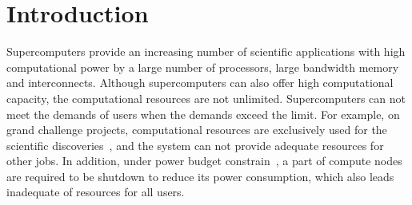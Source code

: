\section{Introduction}
\label{sec:introduction}
Supercomputers provide an increasing number of scientific applications with high computational power by a large number of processors, large bandwidth memory and interconnects.
Although supercomputers can also offer high computational capacity, the computational resources are not unlimited. 
Supercomputers can not meet the demands of users when the demands exceed the limit. 
For example, on grand challenge projects, computational resources are exclusively used for the scientific discoveries~\cite{Scientific_Grand_Challenges_Crosscutting_Technologies_for_Computing_at_the_Exascale, Scientific_Grand_Challenges_in_National_Security_the_Role_of_Computing_at_the_Extreme_Scale}, and the system can not provide adequate resources for other jobs.
In addition, under power budget constrain~\cite{Exploring_Hardware_Overprovisioning_in_Power-constrained_High_Performance_Computing,Operation_of_TSUBAME_2_0_Green_Supercomputer_dealing_with_Power_Crisis}, a part of compute nodes are required to be shutdown to reduce its power consumption, which also leads inadequate of resources for all users. 

